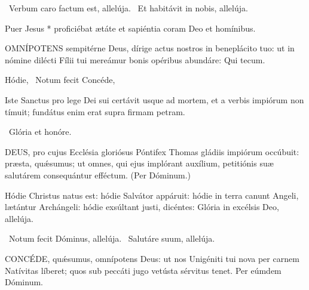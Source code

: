 \V\ Verbum caro factum est, allelúja. \R\ Et habitávit in nobis, allelúja.

 Puer Jesus * proficiébat ætáte et sapiéntia coram Deo et homínibus.


\lettrine[lines=2]{O}{MNÍPOTENS} sempitérne Deus, dírige actus nostros in beneplácito tuo: ut in nómine dilécti Fílii tui mereámur bonis opéribus abundáre: Qui tecum.


 Hódie, \rubric{} \V\ Notum fecit  Concéde, 


\sectionornament






 Iste Sanctus pro lege Dei sui certávit usque ad mortem, et a verbis impiórum non tímuit; fundátus enim erat supra firmam petram.

\V\ Glória et honóre.


\lettrine[lines=2]{D}{EUS}, pro cujus Ecclésia gloriósus Póntifex Thomas gládiis impiórum occúbuit: præsta, quǽsumus; ut omnes, qui ejus implórant auxílium, petitiónis suæ salutárem consequántur efféctum. (Per Dóminum.)


 Hódie Christus natus est: hódie Salvátor appáruit: hódie in terra canunt Angeli, lætántur Archángeli: hódie exsúltant justi, dicéntes: Glória in excélsis Deo, allelúja.

\V\ Notum fecit Dóminus, allelúja. \R\ Salutáre suum, allelúja.


\lettrine[lines=2]{C}{ONCÉDE}, quǽsumus, omnípotens Deus: ut nos Unigéniti tui nova per carnem Natívitas líberet; quos sub peccáti jugo vetústa sérvitus tenet. Per eúmdem Dóminum.

